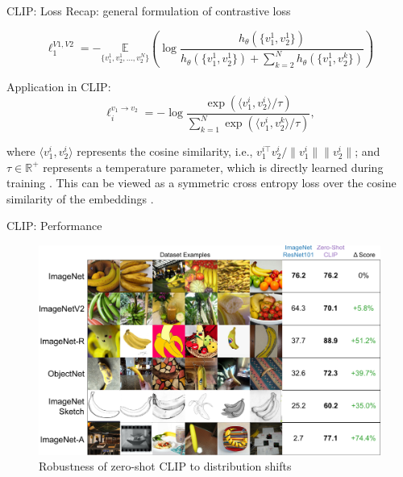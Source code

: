 \documentclass[xcolor=dvipsnames]{beamer}
\begin{document}
\begin{frame}{CLIP: Loss}
  Recap: general formulation of contrastive loss

  \begin{equation}
    \ell_1^{V1, V2} = - \underset{\{v_1^1, v_2^1, \ldots, v_2^N\}}{\mathbb{E}} \left( \log \frac{h_\theta(\{v_1^1,v_2^1\})}{h_\theta(\{v_1^1,v_2^1\}) + \sum_{k=2}^N h_\theta(\{v_1^1, v_2^k\})} \right)
  \end{equation}

  Application in CLIP:
  \begin{equation}
    \ell_i^{v_1 \rightarrow v_2} = - \log \frac{\exp(\langle v_1^i, v_2^i \rangle / \tau)}{\sum_{k=1}^{N} \exp(\langle v_1^i, v_2^k \rangle / \tau)},
  \end{equation}


  where $\langle v_1^i, v_2^i \rangle$ represents the cosine similarity, i.e., $v_1^{i \top} v_2^i / \|v_1^i\| \|v_2^i\|$; and $\tau \in \mathbb{R}^+$ represents a temperature parameter, which is directly learned during training \parencite{zhang2020contrastive}.
  This can be viewed as a symmetric cross entropy loss over the cosine similarity of the embeddings \parencite{radford2021learning}.
\end{frame}

\begin{frame}{CLIP: Performance}
  \begin{figure}[ht]
    \centering
    \includegraphics[width=0.7\linewidth]{../../figures/02-04-text-support-img/performance-clip}
    \caption{Robustness of zero-shot CLIP to distribution shifts \parencite{radford2021learning}}
  \end{figure}
\end{frame}
\end{document}
